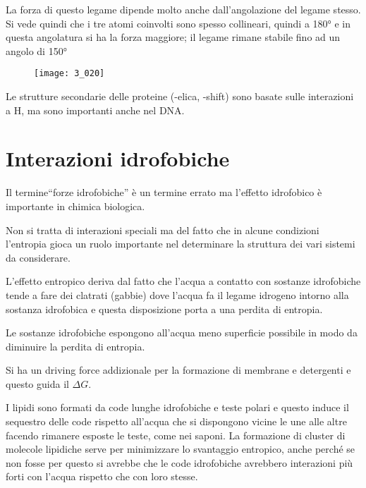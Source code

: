 La forza di questo legame dipende molto anche dall'angolazione del
legame stesso.
Si vede quindi che i tre atomi coinvolti sono spesso collineari, quindi a 180° e in questa angolatura si ha la forza maggiore; il legame rimane stabile fino ad un angolo di 150°

\begin{figure}[H]
  \texttt{[image: 3\_020]}
\end{figure}


Le strutture secondarie delle proteine (\alpha-elica, \beta-shift) sono basate
sulle interazioni a H, ma sono importanti anche nel DNA.




\section{Interazioni idrofobiche}

Il termine``forze idrofobiche'' è un termine errato ma l'effetto idrofobico è
importante in chimica biologica.

Non si tratta di interazioni speciali ma del fatto che in alcune
condizioni l'entropia gioca un ruolo importante nel determinare la
struttura dei vari sistemi da considerare.

L'effetto entropico deriva dal fatto che l'acqua a contatto con
sostanze idrofobiche tende a fare dei clatrati (gabbie) dove l'acqua
fa il legame idrogeno intorno alla sostanza idrofobica e questa
disposizione porta a una perdita di entropia.

Le sostanze idrofobiche espongono all'acqua meno superficie possibile in
modo da diminuire la perdita di entropia.

Si ha un driving force addizionale per la formazione di membrane e
detergenti e questo guida il $\Delta G$.


I lipidi sono formati da code lunghe idrofobiche e teste polari e questo
induce il sequestro delle code rispetto all'acqua che si dispongono
vicine le une alle altre facendo rimanere esposte le teste, come nei saponi.
La formazione di cluster di molecole lipidiche serve per minimizzare lo svantaggio
entropico, anche perché se non fosse per questo si avrebbe che le code idrofobiche
avrebbero interazioni più forti con l’acqua rispetto che con loro stesse.


